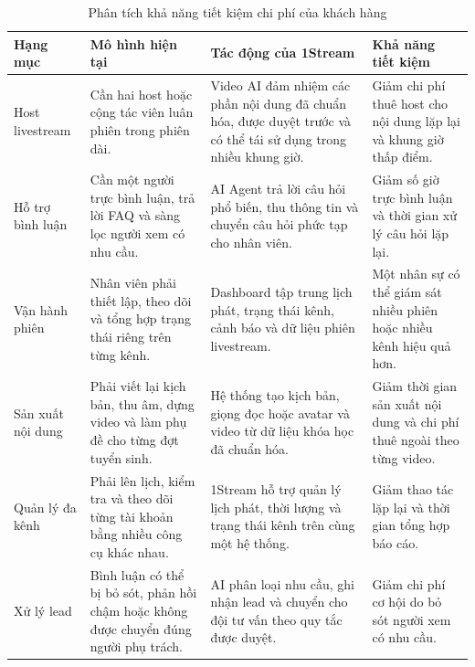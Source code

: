 \begin{table}[H]
    \centering
    \footnotesize
    \setlength{\tabcolsep}{4pt}
    \renewcommand{\arraystretch}{1.3}
    \caption{Phân tích khả năng tiết kiệm chi phí của khách hàng}
    \label{tab:phan-tich-roi-1stream}
    \begin{tabularx}{\linewidth}
        {@{}L{2.7cm}L{3.3cm}Y L{3.0cm}@{}}
        \toprule
        \textbf{Hạng mục} &
        \textbf{Mô hình hiện tại} &
        \textbf{Tác động của 1Stream} &
        \textbf{Khả năng tiết kiệm} \\ \midrule

        Host livestream &
        Cần hai host hoặc cộng tác viên luân phiên trong phiên dài. &
        Video AI đảm nhiệm các phần nội dung đã chuẩn hóa, được duyệt trước
        và có thể tái sử dụng trong nhiều khung giờ. &
        Giảm chi phí thuê host cho nội dung lặp lại và khung giờ thấp điểm. \\

        Hỗ trợ bình luận &
        Cần một người trực bình luận, trả lời FAQ và sàng lọc người xem có
        nhu cầu. &
        AI Agent trả lời câu hỏi phổ biến, thu thông tin và chuyển câu hỏi
        phức tạp cho nhân viên. &
        Giảm số giờ trực bình luận và thời gian xử lý câu hỏi lặp lại. \\

        Vận hành phiên &
        Nhân viên phải thiết lập, theo dõi và tổng hợp trạng thái riêng trên
        từng kênh. &
        Dashboard tập trung lịch phát, trạng thái kênh, cảnh báo và dữ liệu
        phiên livestream. &
        Một nhân sự có thể giám sát nhiều phiên hoặc nhiều kênh hiệu quả hơn. \\

        Sản xuất nội dung &
        Phải viết lại kịch bản, thu âm, dựng video và làm phụ đề cho từng đợt
        tuyển sinh. &
        Hệ thống tạo kịch bản, giọng đọc hoặc avatar và video từ dữ liệu khóa
        học đã chuẩn hóa. &
        Giảm thời gian sản xuất nội dung và chi phí thuê ngoài theo từng video. \\

        Quản lý đa kênh &
        Phải lên lịch, kiểm tra và theo dõi từng tài khoản bằng nhiều công cụ
        khác nhau. &
        1Stream hỗ trợ quản lý lịch phát, thời lượng và trạng thái kênh trên
        cùng một hệ thống. &
        Giảm thao tác lặp lại và thời gian tổng hợp báo cáo. \\

        Xử lý lead &
        Bình luận có thể bị bỏ sót, phản hồi chậm hoặc không được chuyển đúng
        người phụ trách. &
        AI phân loại nhu cầu, ghi nhận lead và chuyển cho đội tư vấn theo
        quy tắc được duyệt. &
        Giảm chi phí cơ hội do bỏ sót người xem có nhu cầu. \\


\end{tabularx}
\end{table}
